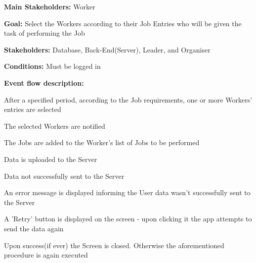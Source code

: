 			\noindent {}
			\begin{packed_item}
				\item \textbf{Main Stakeholders:} Worker
				\item \textbf{Goal:} Select the Workers according to their Job Entries who will be given the task of performing the Job
				\item \textbf{Stakeholders: } Database, Back-End(Server), Leader, and Organiser
				\item \textbf{Conditions: } Must be logged in
				\item \textbf{Event flow description: }
				\begin{packed_enum}
					\item After a specified period, according to the Job requirements, one or more Workers' entries are selected
					\item The selected Workers are notified
					\item The Jobs are added to the Worker's list of Jobs to be performed
					\item Data is uploaded to the Server
				\end{packed_enum}
				
				\begin{packed_item}
					\item[4.a] Data not successfully sent to the Server
					\item[] \begin{packed_enum}
						\item An error message is displayed informing the User data wasn't successfully sent to the Server
						\item A 'Retry' button is displayed on the screen - upon clicking it the app attempts to send the data again
						\item Upon success(if ever) the Screen is closed. Otherwise the aforementioned procedure is again executed
					\end{packed_enum}
				\end{packed_item}
			\end{packed_item}
		
